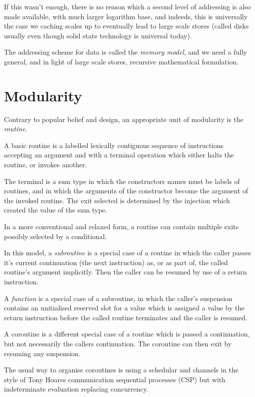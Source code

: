 \documentclass[oneside]{book}
\theoremstyle{plain}
\theoremstyle{definition}
\theoremstyle{plain}
\begin{document}
If this wasn't enough, there is no reason which a second level of addressing
is also made available, with much larger logarithm base, and indeeds,
this is universally the case we caching scales up to eventually lead
to large scale stores (called disks usually even though solid state
technology is universal today).

The addressing scheme for data is called the {\em memory model},
and we need a fully general, and in light of large scale stores,
recursive mathematical formulation.



\chapter{Modularity}
Contrary to popular belief and design, an appropriate unit of modularity
is the {\em routine.}

A basic routine is a labelled lexically contiguous sequence of instructions
accepting an argument and with a terminal operation which either halts
the routine, or invokes another.

The terminal is a sum type in which the constructors names must be labels
of routines, and in which the arguments of the constructor become the
argument of the invoked routine.  The exit selected is determined by
the injection which created the value of the sum type.

In a more conventional and relaxed form, a routine can contain multiple
exits possibly selected by a conditional.

In this model, a {\em subroutine} is a special case of a routine in which
the caller passes it's current continuation (the next instruction) as, or as
part of, the called routine's argument implicitly. Then the caller can be resumed
by use of a return instruction.

A {\em function} is a special case of a subroutine, in which the caller's suspension
contains an unitialised reserved slot for a value which is assigned a value
by the return instruction before the called routine terminates and the caller
is resumed.

A coroutine is a different special case of a routine which is passed a continuation,
but not necessarily the callers continuation. The coroutine can then exit by
resuming any suspension.

The usual way to organise coroutines is using a schedular and channels in the style
of Tony Hoares communication sequential processes (CSP) but with indeterminate
evaluation replacing concurrency.
\end{document}
